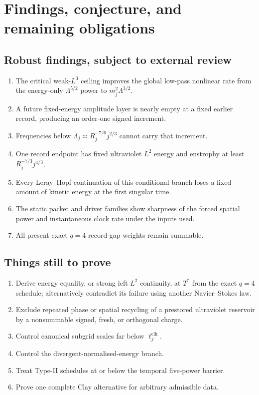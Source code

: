 \documentclass[11pt]{article}
\theoremstyle{remark}
\begin{document}
\section{Findings, conjecture, and remaining obligations}

\subsection*{Robust findings, subject to external review}

\begin{enumerate}
\item The critical weak-\(L^3\) ceiling improves the global low-pass
nonlinear rate from the energy-only \(\Lambda^{5/2}\) power to
\(m_j^2\Lambda^{3/2}\).
\item A future fixed-energy amplitude layer is nearly empty at a fixed
earlier record, producing an order-one signed increment.
\item Frequencies below
\(\Lambda_j\asymp R_j^{-7/6}j^{2/3}\) cannot carry that increment.
\item One record endpoint has fixed ultraviolet \(L^2\) energy and
enstrophy at least \(R_j^{-7/3}j^{4/3}\).
\item Every Leray--Hopf continuation of this conditional branch loses a
fixed amount of kinetic energy at the first singular time.
\item The static packet and driver families show sharpness of the forced
spatial power and instantaneous clock rate under the inputs used.
\item All present exact \(q=4\) record-gap weights remain summable.
\end{enumerate}

\subsection*{Things still to prove}

\begin{enumerate}
\item Derive energy equality, or strong left \(L^2\) continuity, at
\(T^*\) from the exact \(q=4\) schedule; alternatively contradict its
failure using another Navier--Stokes law.
\item Exclude repeated phase or spatial recycling of a prestored
ultraviolet reservoir by a nonsummable signed, fresh, or orthogonal
charge.
\item Control canonical subgrid scales far below
\(\ell_j^{\mathrm{clk}}\).
\item Control the divergent-normalised-energy branch.
\item Treat Type-II schedules at or below the temporal five-power
barrier.
\item Prove one complete Clay alternative for arbitrary admissible data.
\end{enumerate}
\end{document}
